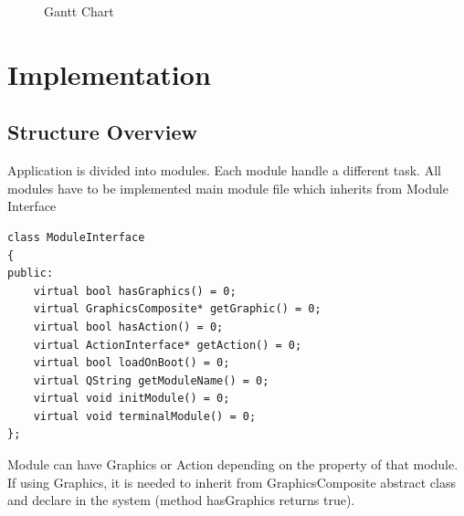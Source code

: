 \documentclass[11pt]{article}
\begin{document}
\begin{figure}[H] 
  \caption {Gantt Chart} 
\end{figure} 

\section{Implementation}
\subsection{Structure Overview} 
Application is divided into modules. Each module handle a different task.
All modules have to be implemented main module file which inherits from Module Interface

\begin{lstlisting}
class ModuleInterface
{
public:
    virtual bool hasGraphics() = 0;
    virtual GraphicsComposite* getGraphic() = 0;
    virtual bool hasAction() = 0;
    virtual ActionInterface* getAction() = 0;
    virtual bool loadOnBoot() = 0;
    virtual QString getModuleName() = 0;
    virtual void initModule() = 0;
    virtual void terminalModule() = 0;
};
\end{lstlisting}

Module can have Graphics or Action depending on the property of that module. If using Graphics, it is needed to inherit from GraphicsComposite abstract class and declare in the system (method hasGraphics returns true). 
\end{document}
